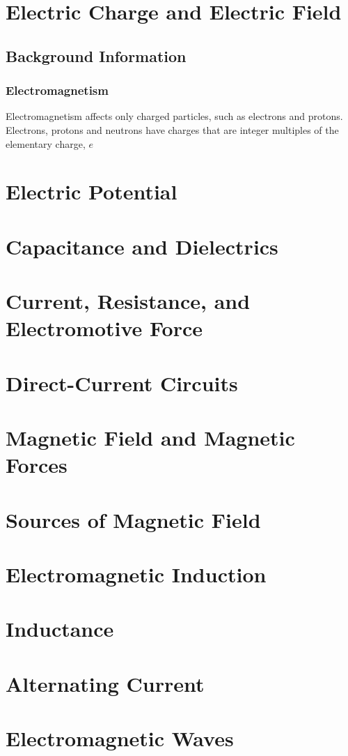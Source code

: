 \documentclass[12pt, letterpaper, titlepage, fleqn]{report}
\title{\textbf{\Huge{ \begin{center}
Physics 230 Notes\\ %
\end{center} }}}
\author{ Lora Ma and Benjamin Kong\\}
\begin{document}
\maketitle

\maketitle %
{
  \hypersetup{}
  \parskip 0pt
  \tableofcontents
} %
\newpage
{}
\pagestyle{mypagestyle}

\chapter{Electric Charge and Electric Field}
\section{Background Information}
\subsection{Electromagnetism}
Electromagnetism affects only charged particles, such as electrons and protons. Electrons, protons and neutrons have charges that are integer multiples of the elementary charge, $e$




\chapter{Electric Potential}
\chapter{Capacitance and Dielectrics}
\chapter{Current, Resistance, and Electromotive Force}
\chapter{Direct-Current Circuits}
\chapter{Magnetic Field and Magnetic Forces}
\chapter{Sources of Magnetic Field}
\chapter{Electromagnetic Induction}
\chapter{Inductance}
\chapter{Alternating Current}
\chapter{Electromagnetic Waves}
\end{document}
